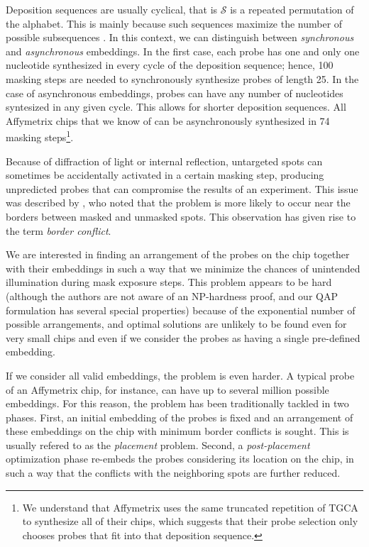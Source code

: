 \documentclass{bioinfo}
\begin{document}
Deposition sequences are usually cyclical, that is $\mathcal{S}$ is a repeated permutation of the alphabet. This is mainly because such sequences maximize the number of possible subsequences \citep{CHASE76}. In this context, we can distinguish between \emph{synchronous} and \emph{asynchronous} embeddings. In the first case, each probe has one and only one nucleotide synthesized in every cycle of the deposition sequence; hence, 100 masking steps are needed to synchronously synthesize probes of length 25. In the case of asynchronous embeddings, probes can have any number of nucleotides syntesized in any given cycle. This allows for shorter deposition sequences. All Affymetrix chips that we know of can be asynchronously synthesized in 74 masking steps\footnote{We understand that Affymetrix uses the same truncated repetition of TGCA to synthesize all of their chips, which suggests that their probe selection only chooses probes that fit into that deposition sequence.}.

Because of diffraction of light or internal reflection, untargeted spots can sometimes be accidentally activated in a certain masking step, producing unpredicted probes that can compromise the results of an experiment. This issue was described by \citet{FODOR91}, who noted that the problem is more likely to occur near the borders between masked and unmasked spots. This observation has given rise to the term \emph{border conflict}.

We are interested in finding an arrangement of the probes on the chip together with their embeddings in such a way that we minimize the chances of unintended illumination during mask exposure steps. This problem appears to be hard (although the authors are not aware of an NP-hardness proof, and our QAP formulation has several special properties) because of the exponential number of possible arrangements, and optimal solutions are unlikely to be found even for very small chips and even if we consider the probes as having a single pre-defined embedding.

If we consider all valid embeddings, the problem is even harder. A typical probe of an Affymetrix chip, for instance, can have up to several million possible embeddings. For this reason, the problem has been traditionally tackled in two phases. First, an initial embedding of the probes is fixed and an arrangement of these embeddings on the chip with minimum border conflicts is sought. This is usually refered to as the \emph{placement} problem. Second, a \emph{post-placement} optimization phase re-embeds the probes considering its location on the chip, in such a way that the conflicts with the neighboring spots are further reduced.
\end{document}
